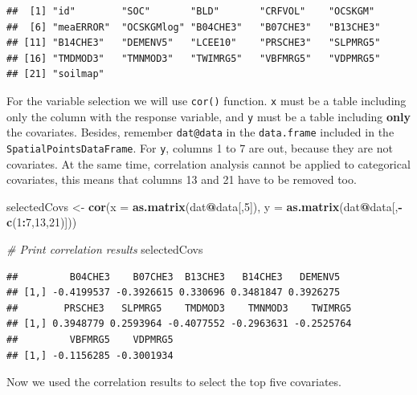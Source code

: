 \documentclass[10pt,b5paper,]{book}
\newenvironment{Shaded}{\begin{snugshade}}{\end{snugshade}}
\newcommand{\CommentTok}[1]{\textcolor[rgb]{0.56,0.35,0.01}{\textit{#1}}}
\newcommand{\DataTypeTok}[1]{\textcolor[rgb]{0.13,0.29,0.53}{#1}}
\newcommand{\DecValTok}[1]{\textcolor[rgb]{0.00,0.00,0.81}{#1}}
\newcommand{\KeywordTok}[1]{\textcolor[rgb]{0.13,0.29,0.53}{\textbf{#1}}}
\newcommand{\NormalTok}[1]{#1}
\newcommand{\OperatorTok}[1]{\textcolor[rgb]{0.81,0.36,0.00}{\textbf{#1}}}
\newcommand{\StringTok}[1]{\textcolor[rgb]{0.31,0.60,0.02}{#1}}
\theoremstyle{definition}
\theoremstyle{definition}
\theoremstyle{definition}
\theoremstyle{remark}
\begin{document}
\begin{verbatim}
##  [1] "id"        "SOC"       "BLD"       "CRFVOL"    "OCSKGM"   
##  [6] "meaERROR"  "OCSKGMlog" "B04CHE3"   "B07CHE3"   "B13CHE3"  
## [11] "B14CHE3"   "DEMENV5"   "LCEE10"    "PRSCHE3"   "SLPMRG5"  
## [16] "TMDMOD3"   "TMNMOD3"   "TWIMRG5"   "VBFMRG5"   "VDPMRG5"  
## [21] "soilmap"
\end{verbatim}

For the variable selection we will use \texttt{cor()} function.
\texttt{x} must be a table including only the column with the response
variable, and \texttt{y} must be a table including \textbf{only} the
covariates. Besides, remember \texttt{dat@data} in the
\texttt{data.frame} included in the \texttt{SpatialPointsDataFrame}. For
\texttt{y}, columns 1 to 7 are out, because they are not covariates. At
the same time, correlation analysis cannot be applied to categorical
covariates, this means that columns 13 and 21 have to be removed too.

\begin{Shaded}
\begin{Highlighting}[]
\NormalTok{selectedCovs <-}\StringTok{ }\KeywordTok{cor}\NormalTok{(}\DataTypeTok{x =} \KeywordTok{as.matrix}\NormalTok{(dat}\OperatorTok{@}\NormalTok{data[,}\DecValTok{5}\NormalTok{]),}
           \DataTypeTok{y =} \KeywordTok{as.matrix}\NormalTok{(dat}\OperatorTok{@}\NormalTok{data[,}\OperatorTok{-}\KeywordTok{c}\NormalTok{(}\DecValTok{1}\OperatorTok{:}\DecValTok{7}\NormalTok{,}\DecValTok{13}\NormalTok{,}\DecValTok{21}\NormalTok{)]))}

\CommentTok{# Print correlation results}
\NormalTok{selectedCovs}
\end{Highlighting}
\end{Shaded}

\begin{verbatim}
##         B04CHE3    B07CHE3  B13CHE3   B14CHE3   DEMENV5
## [1,] -0.4199537 -0.3926615 0.330696 0.3481847 0.3926275
##        PRSCHE3   SLPMRG5    TMDMOD3    TMNMOD3    TWIMRG5
## [1,] 0.3948779 0.2593964 -0.4077552 -0.2963631 -0.2525764
##         VBFMRG5    VDPMRG5
## [1,] -0.1156285 -0.3001934
\end{verbatim}

Now we used the correlation results to select the top five covariates.
\end{document}
